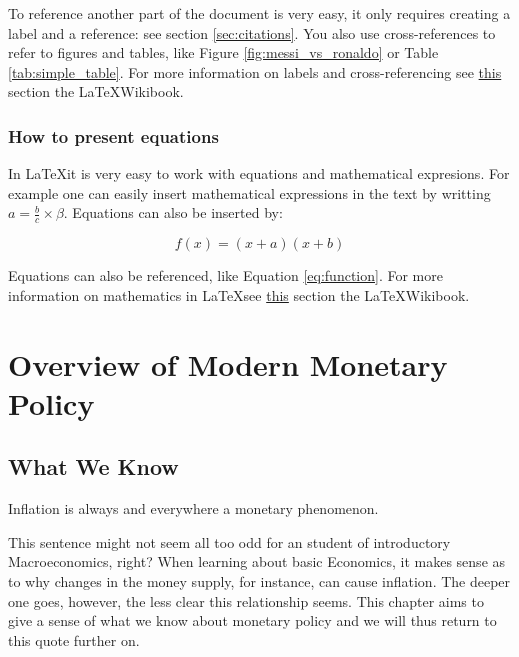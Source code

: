 \documentclass[11pt,a4paper,oneside]{book}
\newcommand{\latex}{\LaTeX{}} %
\begin{document}
To reference another part of the document is very easy, it only requires creating a label and a reference: see section \ref{sec:citations}. You also use cross-references to refer to figures and tables, like Figure \ref{fig:messi_vs_ronaldo} or Table \ref{tab:simple_table}. For more information on labels and cross-referencing see \href{https://en.wikibooks.org/wiki/LaTeX/Labels_and_Cross-referencing}{this} section the \latex Wikibook.

\section{How to present equations}
\label{sec:math}
In \latex it is very easy to work with equations and mathematical expresions. For example one can easily insert mathematical expressions in the text by writting $ a = \frac{b}{c} \times \beta $. Equations can also be inserted by:

\begin{equation}
  f(x)=(x+a)(x+b)
  \label{eq:function}
\end{equation}

Equations can also be referenced, like Equation \ref{eq:function}. For more information on mathematics in \latex see \href{https://en.wikibooks.org/wiki/LaTeX/Mathematics}{this} section the \latex Wikibook.

\part{Overview of Modern Monetary Policy}
\chapter{What We Know}
\epigraph{Inflation is always and everywhere a monetary phenomenon.}{\citet{Friedman_1963}}

This sentence might not seem all too odd for an student of introductory Macroeconomics, right? When learning about basic Economics, it makes sense as to why changes in the money supply, for instance, can cause inflation. The deeper one goes, however, the less clear this relationship seems. This chapter aims to give a sense of what we know about monetary policy and we will thus return to this quote further on.
\end{document}
